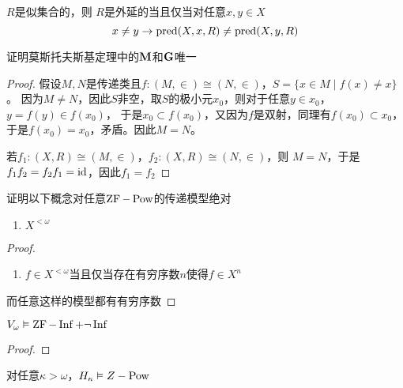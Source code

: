 \documentclass[11pt]{article}
\begin{document}
\begin{exercise}
\(R\)是似集合的，则
\(R\)是外延的当且仅当对任意\(x,y\in X\)
\begin{equation*}
x\neq y\to\text{pred}(X,x,R)\neq\text{pred}(X,y,R)
\end{equation*}
\end{exercise}

\begin{exercise}[7.10.7]
证明莫斯托夫斯基定理中的\(\operatorname{\textbf{M}}\)和\(\operatorname{\textbf{G}}\)唯一
\end{exercise}

\begin{proof}
假设\(M,N\)是传递类且\(f:(M,\in)\cong(N,\in)\)，\(S=\{x\in M\mid f(x)\neq x\}\)。
因为\(M\neq N\)，因此\(S\)非空，取\(S\)的极小元\(x_0\)，则对于任意\(y\in x_0\)，\(y=f(y)\in f(x_0)\)，
于是\(x_0\subset f(x_0)\)，又因为\(f\)是双射，同理有\(f(x_0)\subset x_0\)，于是\(f(x_0)=x_0\)，矛盾。因此\(M=N\)。

若\(f_1:(X,R)\cong(M,\in)\)，\(f_2:(X,R)\cong(N,\in)\)，则 \(M=N\)，于是\(f_1f_2=f_2f_1=\operatorname{id}\)，因此\(f_1=f_2\)
\end{proof}

\begin{exercise}[7.10.8]
证明以下概念对任意\(\operatorname{ZF}-\operatorname{Pow}\)的传递模型绝对
\begin{enumerate}
\item \(X^{<\omega}\)
\end{enumerate}
\end{exercise}

\begin{proof}
\begin{enumerate}
\item \(f\in X^{<\omega}\)当且仅当存在有穷序数\(n\)使得\(f\in X^n\)
\end{enumerate}

而任意这样的模型都有有穷序数
\end{proof}

\begin{exercise}[7.10.9]
\(V_\omega\vDash\operatorname{ZF}-\operatorname{Inf}+\neg\operatorname{Inf}\)
\end{exercise}

\begin{proof}

\end{proof}

\begin{exercise}[7.10.11]
对任意\(\kappa>\omega\)，\(H_\kappa\vDash Z-\operatorname{Pow}\)
\end{exercise}
\end{document}
